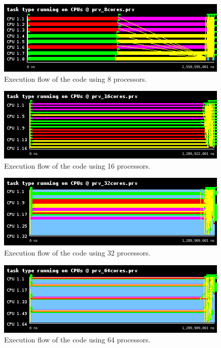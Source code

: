 \documentclass[12pt, a4paper]{article}
\begin{document}
\begin{figure}[H]
	\centering
	\includegraphics[scale=0.75]{./images/S1_scalability/S1_scalability_8}
	
	\label{fig_ann:S1_scalability_8}
	\caption{Execution flow of the code using 8 processors.}
\end{figure}





\begin{figure}[H]
	\centering
	\includegraphics[scale=0.75]{./images/S1_scalability/S1_scalability_16}
	
	\label{fig_ann:S1_scalability_16}
	\caption{Execution flow of the code using 16 processors.}
\end{figure}





\begin{figure}[H]
	\centering
	\includegraphics[scale=0.75]{./images/S1_scalability/S1_scalability_32}
	
	\label{fig_ann:S1_scalability_32}
	\caption{Execution flow of the code using 32 processors.}
\end{figure}





\begin{figure}[H]
	\centering
	\includegraphics[scale=0.75]{./images/S1_scalability/S1_scalability_64}
	
	\label{fig_ann:S1_scalability_64}
	\caption{Execution flow of the code using 64 processors.}
\end{figure}
\end{document}
